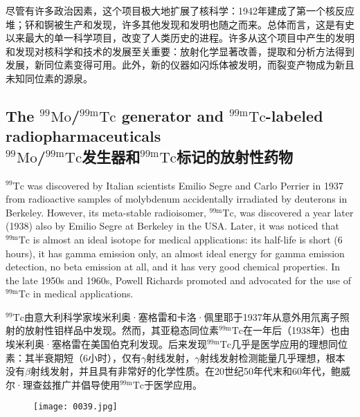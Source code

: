 \documentclass[dvipsnames, svgnames,a4paper,11pt]{article}
\begin{document}
尽管有许多政治因素，这个项目极大地扩展了核科学：1942年建成了第一个核反应堆；钚和锕被生产和发现，许多其他发现和发明也随之而来。总体而言，这是有史以来最大的单一科学项目，改变了人类历史的进程。许多从这个项目中产生的发明和发现对核科学和技术的发展至关重要：放射化学显著改善，提取和分析方法得到发展，新同位素变得可用。此外，新的仪器如闪烁体被发明，而裂变产物成为新且未知同位素的源泉。

\subsection{The ${}^\text{99}\text{Mo}$/${}^\text{99m}\text{Tc}$ generator and ${}^\text{99m}\text{Tc}$-labeled radiopharmaceuticals \\${}^\text{99}\text{Mo}$/${}^\text{99m}\text{Tc}$发生器和${}^\text{99m}\text{Tc}$标记的放射性药物}

${}^\text{99}\text{Tc}$ was discovered by Italian scientists Emilio Segre and Carlo Perrier in 1937 from radioactive samples of molybdenum accidentally irradiated by deuterons in Berkeley. However, its meta-stable radioisomer, ${}^\text{99m}\text{Tc}$, was discovered a year later (1938) also by Emilio Segre at Berkeley in the USA. Later, it was noticed that ${}^\text{99m}\text{Tc}$ is almost an ideal isotope for medical applications: its half-life is short (6 hours), it has gamma emission only, an almost ideal energy for gamma emission detection, no beta emission at all, and it has very good chemical properties. In the late 1950s and 1960s, Powell Richards promoted and advocated for the use of ${}^\text{99m}\text{Tc}$ in medical applications.

${}^\text{99}\text{Tc}$由意大利科学家埃米利奥·塞格雷和卡洛·佩里耶于1937年从意外用氘离子照射的放射性钼样品中发现。然而，其亚稳态同位素${}^\text{99m}\text{Tc}$在一年后（1938年）也由埃米利奥·塞格雷在美国伯克利发现。后来发现${}^\text{99m}\text{Tc}$几乎是医学应用的理想同位素：其半衰期短（6小时），仅有$\gamma$射线发射，$\gamma$射线发射检测能量几乎理想，根本没有$\beta$射线发射，并且具有非常好的化学性质。在20世纪50年代末和60年代，鲍威尔·理查兹推广并倡导使用${}^\text{99m}\text{Tc}$于医学应用。

\begin{figure}[htbp]
      \centering
      \texttt{[image: 0039.jpg]}
       \label{fig30}
\end{figure}
\end{document}
